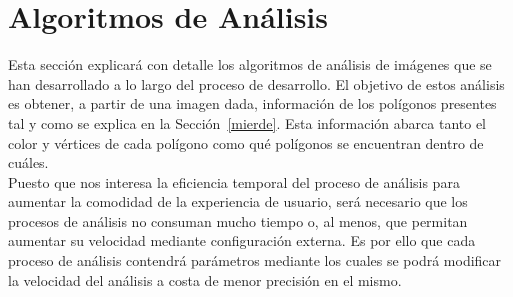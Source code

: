 \section{Algoritmos de Análisis}
\label{sec:algAnalisis}

Esta sección explicará con detalle los algoritmos de análisis de imágenes que se han desarrollado a lo largo del proceso de desarrollo. El objetivo de estos análisis es obtener, a partir de una imagen dada, información de los polígonos presentes tal y como se explica en la Sección~\ref{mierde}. Esta información abarca tanto el color y vértices de cada polígono como qué polígonos se encuentran dentro de cuáles.\\

Puesto que nos interesa la eficiencia temporal del proceso de análisis para aumentar la comodidad de la experiencia de usuario, será necesario que los procesos de análisis no consuman mucho tiempo o, al menos, que permitan aumentar su velocidad mediante configuración externa. Es por ello que cada proceso de análisis contendrá parámetros mediante los cuales se podrá modificar la velocidad del análisis a costa de menor precisión en el mismo.\\

